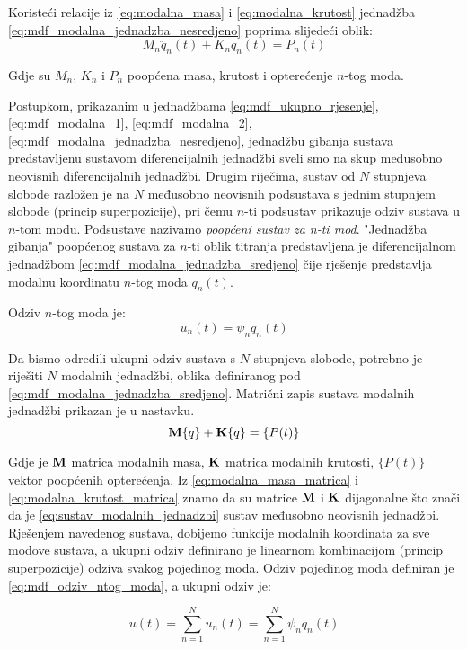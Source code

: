 Koristeći relacije iz \eqref{eq:modalna_masa} i \eqref{eq:modalna_krutost} jednadžba
\eqref{eq:mdf_modalna_jednadzba_nesredjeno} poprima slijedeći oblik:
\begin{equation}\label{eq:mdf_modalna_jednadzba_sredjeno}
    M_n\ddot{q}_n(t)+K_nq_n(t)=P_n(t)
\end{equation}

Gdje su $M_n$, $K_n$ i $P_n$ poopćena masa, krutost i opterećenje $n$-tog moda.

Postupkom, prikazanim u jednadžbama \eqref{eq:mdf_ukupno_rjesenje},
\eqref{eq:mdf_modalna_1}, \eqref{eq:mdf_modalna_2},
\eqref{eq:mdf_modalna_jednadzba_nesredjeno}, jednadžbu gibanja sustava predstavljenu
sustavom diferencijalnih jednadžbi sveli smo na skup međusobno neovisnih
diferencijalnih jednadžbi. Drugim riječima, sustav od $N$ stupnjeva slobode razložen
je na $N$ međusobno neovisnih podsustava s jednim stupnjem slobode (princip superpozicije), 
pri čemu $n$-ti podsustav prikazuje odziv sustava u $n$-tom modu. Podsustave 
nazivamo \textit{poopćeni sustav za n-ti mod}. "Jednadžba gibanja" 
poopćenog sustava za $n$-ti oblik titranja predstavljena je diferencijalnom jednadžbom
\eqref{eq:mdf_modalna_jednadzba_sredjeno} čije rješenje predstavlja modalnu 
koordinatu $n$-tog moda $q_n(t)$.
\par

Odziv $n$-tog moda je:
\begin{equation}\label{eq:mdf_odziv_ntog_moda}
    u_n(t)=\psi_nq_n(t)
\end{equation}

Da bismo odredili ukupni odziv sustava s $N$-stupnjeva slobode, potrebno je riješiti
$N$ modalnih jednadžbi, oblika definiranog pod \eqref{eq:mdf_modalna_jednadzba_sredjeno}.
Matrični zapis sustava modalnih jednadžbi prikazan je u nastavku.
\begin{equation}\label{eq:sustav_modalnih_jednadzbi}
    \mathbf{M}\{q\} + \mathbf{K}\{q\}=\{P(t)\}
\end{equation}

Gdje je $\mathbf{M}$ matrica modalnih masa, $\mathbf{K}$ matrica modalnih krutosti, $\{P(t)\}$
vektor poopćenih opterećenja. Iz \eqref{eq:modalna_masa_matrica} i
\eqref{eq:modalna_krutost_matrica} znamo da su matrice $\mathbf{M}$ i $\mathbf{K}$ dijagonalne što
znači da je \eqref{eq:sustav_modalnih_jednadzbi} sustav međusobno neovisnih jednadžbi.
Rješenjem navedenog sustava, dobijemo funkcije modalnih koordinata za sve modove
sustava, a ukupni odziv definirano je linearnom kombinacijom (princip superpozicije) 
odziva svakog pojedinog moda. Odziv pojedinog moda definiran je
\eqref{eq:mdf_odziv_ntog_moda}, a ukupni odziv je:

\begin{equation}\label{eq:mdf_modalna_ukupno_rjesenje}
    u(t)=\sum_{n=1}^Nu_n(t)=\sum_{n=1}^N\psi_nq_n(t)
\end{equation}
